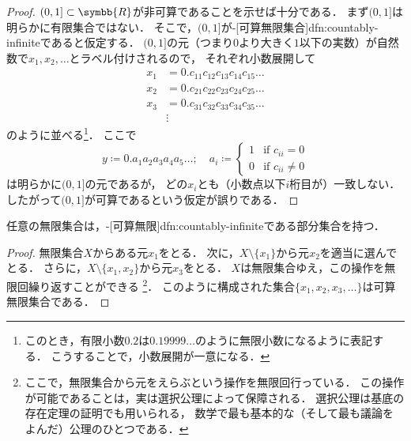 \documentclass[../sotsu.tex]{subfiles}
\begin{document}
\begin{proof}
    $(0, 1] \subset \symbb{R}$が非可算であることを示せば十分である．
    まず$(0, 1]$は明らかに有限集合ではない．
    そこで，$(0, 1]$が-[可算無限集合]{dfn:countably-infinite}であると仮定する．
    $(0, 1]$の元（つまり$0$より大きく$1$以下の実数）が自然数で$x_1, x_2, \dotsc$とラベル付けされるので，
    それぞれ小数展開して
    \begin{align*}
        x_1 &= 0.c_{11}c_{12}c_{13}c_{14}c_{15}\dotso \\
        x_2 &= 0.c_{21}c_{22}c_{23}c_{24}c_{25}\dotso \\
        x_3 &= 0.c_{31}c_{32}c_{33}c_{34}c_{35}\dotso \\
        &\vdots 
    \end{align*}
    のように並べる\footnote{
        このとき，有限小数$0.2$は$0.19999\dotso$のように無限小数になるように表記する．
        こうすることで，小数展開が一意になる\cite[\S 7]{uchida-set-2020}．
    }．
    ここで
    \begin{equation*}
        y \coloneq 0. a_1 a_2 a_3 a_4 a_5 \dotso;
            \quad a_i \coloneq
            \begin{cases}
                1  &  \text{if } c_{ii}   =  0  \\
                0  &  \text{if } c_{ii} \neq 0
            \end{cases}
    \end{equation*}
    は明らかに$(0, 1]$の元であるが，
    どの$x_i$とも（小数点以下$i$桁目が）一致しない．
    したがって$(0, 1]$が可算であるという仮定が誤りである\cite[\S 7]{uchida-set-2020}．
\end{proof}



\begin{proposition}
    \label{thm:countable-subset}
    任意の無限集合は，-[可算無限]{dfn:countably-infinite}である部分集合を持つ．
\end{proposition}

\begin{proof}
    無限集合$X$からある元$x_1$をとる．
    次に，$X \setminus \{ x_1 \}$から元$x_2$を適当に選んでとる．
    さらに，$X \setminus \{ x_1, x_2 \}$から元$x_3$をとる．
    $X$は無限集合ゆえ，この操作を無限回繰り返すことができる%
    \footnote{
        ここで，無限集合から元をえらぶという操作を無限回行っている．
        この操作が可能であることは，実は選択公理によって保障される．
        選択公理は基底の存在定理の証明でも用いられる，
        数学で最も基本的な（そして最も議論をよんだ）公理のひとつである．
    }．
    このように構成された集合$\{ x_1, x_2, x_3, \dotsc \}$は可算無限集合である．
\end{proof}
\end{document}
